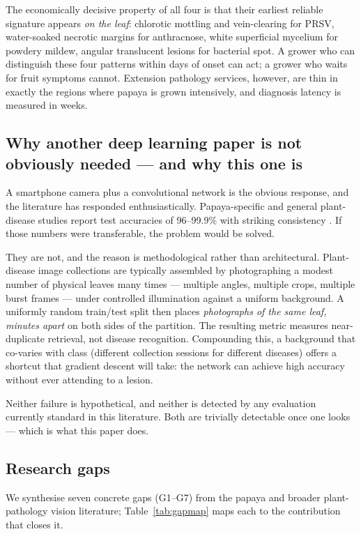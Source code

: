 \documentclass[10pt,twocolumn,a4paper]{article}
\begin{document}
The economically decisive property of all four is that their earliest reliable signature appears \emph{on the leaf}: chlorotic mottling and vein-clearing for PRSV, water-soaked necrotic margins for anthracnose, white superficial mycelium for powdery mildew, angular translucent lesions for bacterial spot. A grower who can distinguish these four patterns within days of onset can act; a grower who waits for fruit symptoms cannot. Extension pathology services, however, are thin in exactly the regions where papaya is grown intensively, and diagnosis latency is measured in weeks.

\subsection{Why another deep learning paper is not obviously needed --- and why this one is}
A smartphone camera plus a convolutional network is the obvious response, and the literature has responded enthusiastically. Papaya-specific and general plant-disease studies report test accuracies of 96--99.9\% with striking consistency \cite{banarase2024,srivathsan2026,salaheldin2026,danuarta2026}. If those numbers were transferable, the problem would be solved.

They are not, and the reason is methodological rather than architectural. Plant-disease image collections are typically assembled by photographing a modest number of physical leaves many times --- multiple angles, multiple crops, multiple burst frames --- under controlled illumination against a uniform background. A uniformly random train/test split then places \emph{photographs of the same leaf, minutes apart} on both sides of the partition. The resulting metric measures near-duplicate retrieval, not disease recognition. Compounding this, a background that co-varies with class (different collection sessions for different diseases) offers a shortcut that gradient descent will take: the network can achieve high accuracy without ever attending to a lesion.

Neither failure is hypothetical, and neither is detected by any evaluation currently standard in this literature. Both are trivially detectable once one looks --- which is what this paper does.

\subsection{Research gaps}
We synthesise seven concrete gaps (G1--G7) from the papaya and broader plant-pathology vision literature; Table~\ref{tab:gapmap} maps each to the contribution that closes it.
\end{document}
